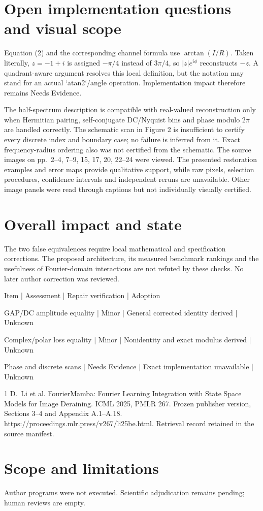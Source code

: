 \documentclass[10pt]{article}
\begin{document}
\section*{Open implementation questions and visual scope}
Equation (2) and the corresponding channel formula use \(\arctan(I/R)\). Taken literally, \(z=-1+i\) is assigned \(-\pi/4\) instead of \(3\pi/4\), so \(|z|e^{i\phi}\) reconstructs \(-z\). A quadrant-aware argument resolves this local definition, but the notation may stand for an actual `atan2`/angle operation. Implementation impact therefore remains Needs Evidence.\par
The half-spectrum description is compatible with real-valued reconstruction only when Hermitian pairing, self-conjugate DC/Nyquist bins and phase modulo \(2\pi\) are handled correctly. The schematic scan in Figure 2 is insufficient to certify every discrete index and boundary case; no failure is inferred from it. Exact frequency-radius ordering also was not certified from the schematic. The source images on pp. 2–4, 7–9, 15, 17, 20, 22–24 were viewed. The presented restoration examples and error maps provide qualitative support, while raw pixels, selection procedures, confidence intervals and independent reruns are unavailable. Other image panels were read through captions but not individually visually certified.\par
\section*{Overall impact and state}
The two false equivalences require local mathematical and specification corrections. The proposed architecture, its measured benchmark rankings and the usefulness of Fourier-domain interactions are not refuted by these checks. No later author correction was reviewed.\par
Item | Assessment | Repair verification | Adoption\par
GAP/DC amplitude equality | Minor | General corrected identity derived | Unknown\par
Complex/polar loss equality | Minor | Nonidentity and exact modulus derived | Unknown\par
Phase and discrete scans | Needs Evidence | Exact implementation unavailable | Unknown\par
1 D. Li et al. FourierMamba: Fourier Learning Integration with State Space Models for Image Deraining. ICML 2025, PMLR 267. Frozen publisher version, Sections 3–4 and Appendix A.1–A.18. https://proceedings.mlr.press/v267/li25be.html. Retrieval record retained in the source manifest.\par
\section*{Scope and limitations}
Author programs were not executed. Scientific adjudication remains pending; human reviews are empty.\par
\end{document}
